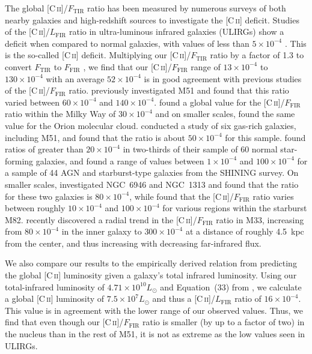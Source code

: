 The global [C\,\textsc{ii}]/$F_{\mathrm{TIR}}$ ratio has been measured by numerous surveys of both nearby galaxies and high-redshift sources to investigate the [C\,\textsc{ii}] deficit.  Studies of the [C\,\textsc{ii}]/$L_{\mathrm{FIR}}$ ratio in ultra-luminous infrared galaxies (ULIRGs) show a deficit when compared to normal galaxies, with values of less than $5 \times 10^{-4}$ \citep[e.g.,][]{1998ApJ...504L..11L,2003ApJ...594..758L}.  This is the so-called [C\,\textsc{ii}] deficit.  Multiplying our [C\,\textsc{ii}]/$F_{\mathrm{TIR}}$ ratio by a factor of 1.3 to convert $F_{\mathrm{TIR}}$ to $F_{\mathrm{FIR}}$ \citep{2008A&A...479..703G}, we find that our [C\,\textsc{ii}]/$F_{\mathrm{FIR}}$ range of $13 \times 10^{-4}$ to $130 \times 10^{-4}$ with an average $52 \times 10^{-4}$ is in good agreement with previous studies of the [C\,\textsc{ii}]/$F_{\mathrm{FIR}}$ ratio.  \citet{2001ApJ...561..203N} previously investigated M51 and found that this ratio varied between $60 \times 10^{-4}$ and $140 \times 10^{-4}$.  \citet{1985ApJ...289..803S} found a global value for the [C\,\textsc{ii}]/$F_{\mathrm{FIR}}$ ratio within the Milky Way of $30 \times 10^{-4}$ and on smaller scales, \citet{1993ApJ...404..219S} found the same value for the Orion molecular cloud.  \citet{1985ApJ...291..755C} conducted a study of six gas-rich galaxies, including M51, and found that the ratio is about $50 \times 10^{-4}$ for this sample. \citet{2001ApJ...561..766M} found ratios of greater than $20 \times 10^{-4}$ in two-thirds of their sample of 60 normal star-forming galaxies, and \citet{2011ApJ...728L...7G} found a range of values between $1 \times 10^{-4}$ and $100 \times 10^{-4}$ for a sample of 44 AGN and starburst-type galaxies from the SHINING survey.  On smaller scales, \citet{2002AJ....124..751C} investigated NGC~6946 and NGC~1313 and found that the ratio for these two galaxies is $80 \times 10^{-4}$, while \citet{2013A&A...549A.118C} found that the [C\,\textsc{ii}]/$F_{\mathrm{FIR}}$ ratio varies between roughly $10 \times 10^{-4}$ and $100 \times 10^{-4}$ for various regions within the starburst M82.  \citet{2013A&A...553A.114K} recently discovered a radial trend in the [C\,\textsc{ii}]/$F_{\mathrm{FIR}}$ ratio in M33, increasing from $80 \times 10^{-4}$ in the inner galaxy to $300 \times 10^{-4}$ at a distance of roughly 4.5~kpc from the center, and thus increasing with decreasing far-infrared flux.

We also compare our results to the empirically derived relation from \citet{2012ApJ...745..171S} predicting the global [C\,\textsc{ii}] luminosity given a galaxy's total infrared luminosity.  Using our total-infrared luminosity of $4.71 \times 10^{10} L_{\odot}$ and Equation~(33) from \citet{2012ApJ...745..171S}, we calculate a global [C\,\textsc{ii}] luminosity of $7.5 \times 10^{7} L_{\odot}$ and thus a [C\,\textsc{ii}]/$L_{\mathrm{FIR}}$ ratio of $16 \times 10^{-4}$.  This value is in agreement with the lower range of our observed values.  Thus, we find that even though our [C\,\textsc{ii}]/$F_{\mathrm{FIR}}$ ratio is smaller (by up to a factor of two) in the nucleus than in the rest of M51, it is not as extreme as the low values seen in ULIRGs.

